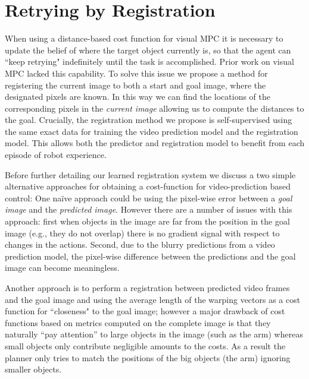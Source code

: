 \vspace{-0.1cm}
\section{Retrying by Registration}
\label{sec:reg}
\vspace{-0.2cm}
When using a distance-based cost function for visual MPC it is necessary to update the belief of where the target object currently is, so that the agent can ``keep retrying" indefinitely until the task is accomplished. Prior work on visual MPC lacked this capability. To solve this issue we propose a method for registering the current image to both a start and goal image, where the designated pixels are known. In this way we can find the locations of the corresponding pixels in the \emph{current image} allowing us to compute the distances to the goal. Crucially, the registration method we propose is self-supervised using the same exact data for training the video prediction model and the registration model. This allows both the predictor and registration model to benefit from each episode of robot experience.

Before further detailing our learned registration system we discuss a two simple alternative approaches for obtaining a cost-function for video-prediction based control: One na\"{i}ve approach could be using the pixel-wise error between a \emph{goal image} and the \emph{predicted image}. However there are a number of issues with this approach: first when objects in the image are far from the position in the goal image (e.g., they do not overlap) there is no gradient signal with respect to changes in the actions. Second, due to the blurry predictions from a video prediction model, the pixel-wise difference between the predictions and the goal image can become meaningless. 

Another approach is to perform a registration between predicted video frames and the goal image and using the average length of the warping vectors as a cost function for ``closeness" to the goal image; however a major drawback of cost functions based on metrics computed on the complete image is that they naturally ``pay attention'' to large objects in the image (such as the arm) whereas small objects only contribute negligible amounts to the costs. As a result the planner only tries to match the positions of the big objects (the arm) ignoring smaller objects.


